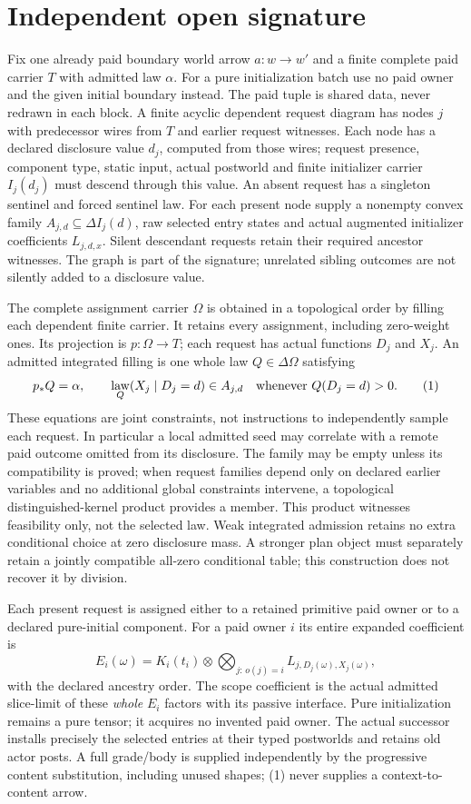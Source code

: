 \documentclass[11pt]{article}
\begin{document}
\section{Independent open signature}
Fix one already paid boundary world arrow $a:w\to w'$ and a finite complete paid carrier $T$ with admitted law $\alpha$. For a pure initialization batch use no paid owner and the given initial boundary instead. The paid tuple is shared data, never redrawn in each block. A finite acyclic dependent request diagram has nodes $j$ with predecessor wires from $T$ and earlier request witnesses. Each node has a declared disclosure value $d_j$, computed from those wires; request presence, component type, static input, actual postworld and finite initializer carrier $I_j(d_j)$ must descend through this value. An absent request has a singleton sentinel and forced sentinel law. For each present node supply a nonempty convex family $A_{j,d}\subseteq\Delta I_j(d)$, raw selected entry states and actual augmented initializer coefficients $L_{j,d,x}$. Silent descendant requests retain their required ancestor witnesses. The graph is part of the signature; unrelated sibling outcomes are not silently added to a disclosure value.

The complete assignment carrier $\Omega$ is obtained in a topological order by filling each dependent finite carrier. It retains every assignment, including zero-weight ones. Its projection is $p:\Omega\to T$; each request has actual functions $D_j$ and $X_j$. An admitted integrated filling is one whole law $Q\in\Delta\Omega$ satisfying
\[
 p_*Q=\alpha,\qquad
 \mathop{\rm law}_Q(X_j\mid D_j=d)\in A_{j,d}
       \quad\text{whenever }Q(D_j=d)>0.                 \tag{1}
\]
These equations are joint constraints, not instructions to independently sample each request. In particular a local admitted seed may correlate with a remote paid outcome omitted from its disclosure. The family may be empty unless its compatibility is proved; when request families depend only on declared earlier variables and no additional global constraints intervene, a topological distinguished-kernel product provides a member. This product witnesses feasibility only, not the selected law. Weak integrated admission retains no extra conditional choice at zero disclosure mass. A stronger plan object must separately retain a jointly compatible all-zero conditional table; this construction does not recover it by division.

Each present request is assigned either to a retained primitive paid owner or to a declared pure-initial component. For a paid owner $i$ its entire expanded coefficient is
\[
     E_i(\omega)=K_i(t_i)\otimes
          \bigotimes_{j:\,o(j)=i}L_{j,D_j(\omega),X_j(\omega)}, \tag{2}
\]
with the declared ancestry order. The scope coefficient is the actual admitted slice-limit of these \emph{whole} $E_i$ factors with its passive interface. Pure initialization remains a pure tensor; it acquires no invented paid owner. The actual successor installs precisely the selected entries at their typed postworlds and retains old actor posts. A full grade/body is supplied independently by the progressive content substitution, including unused shapes; (1) never supplies a context-to-content arrow.
\end{document}
